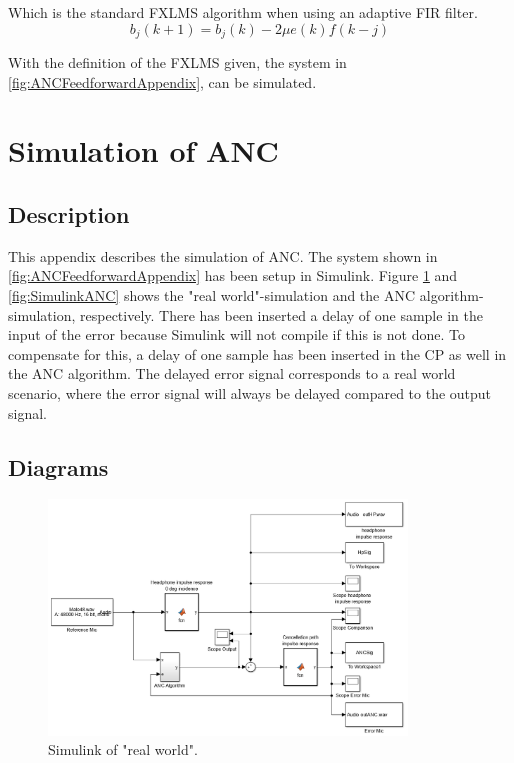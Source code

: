 Which is the standard FXLMS algorithm when using an adaptive FIR filter.
\begin{equation}\label{eq:FXLMSw_j(k+1)}
b_j(k+1) = b_j(k) - 2\mu e(k)f(k-j)
\end{equation}

With the definition of the FXLMS given, the system in \autoref{fig:ANCFeedforwardAppendix}, can be simulated.
















\newpage
\section{Simulation of ANC} \label{sec:ANCSimulation}
\subsection{Description}
This appendix describes the simulation of ANC. The system shown in \autoref{fig:ANCFeedforwardAppendix} has been setup in Simulink. Figure \ref{fig:SimulinkRealWorld} and \autoref{fig:SimulinkANC} shows the "real world"-simulation and the ANC algorithm-simulation, respectively. There has been inserted a delay of one sample in the input of the error because Simulink will not compile if this is not done. To compensate for this, a delay of one sample has been inserted in the CP as well in the ANC algorithm. The delayed error signal corresponds to a real world scenario, where the error signal will always be delayed compared to the output signal.   

\subsection{Diagrams}
\begin{figure}[H]
	\centering
	\includegraphics[width=0.85\textwidth]{figures/BasicSystem/SimulinkRealWorld}
	\caption{Simulink of "real world".}
	\label{fig:SimulinkRealWorld}
\end{figure}    

